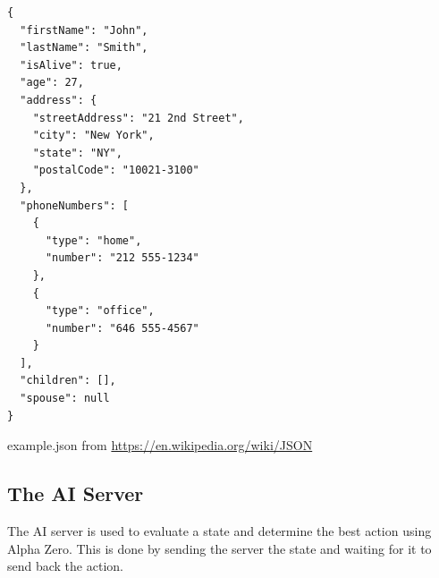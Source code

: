 \documentclass[12pt]{article}
\begin{document}
\begin{listing}[H]
\begin{verbatim}
{
  "firstName": "John",
  "lastName": "Smith",
  "isAlive": true,
  "age": 27,
  "address": {
    "streetAddress": "21 2nd Street",
    "city": "New York",
    "state": "NY",
    "postalCode": "10021-3100"
  },
  "phoneNumbers": [
    {
      "type": "home",
      "number": "212 555-1234"
    },
    {
      "type": "office",
      "number": "646 555-4567"
    }
  ],
  "children": [],
  "spouse": null
}
\end{verbatim}
\caption{example.json \newline\indent from \href{https://en.wikipedia.org/wiki/JSON}{https://en.wikipedia.org/wiki/JSON}} 
\label{listing:dataAssociation}
\end{listing}
\subsection{The AI Server}
The AI server is used to evaluate a state and determine the best action using Alpha Zero. This is done by sending the server the state and waiting for it to send back the action.
\end{document}
